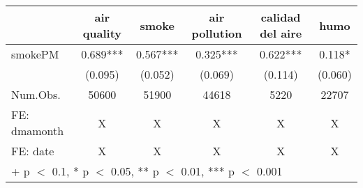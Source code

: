 \begin{table}
\centering
\begin{tabular}[t]{lccccc}
\toprule
  & air quality & smoke & air pollution & calidad del aire & humo\\
\midrule
smokePM & 0.689*** & 0.567*** & 0.325*** & 0.622*** & 0.118*\\
 & (0.095) & (0.052) & (0.069) & (0.114) & (0.060)\\
\midrule
Num.Obs. & 50600 & 51900 & 44618 & 5220 & 22707\\
FE: dmamonth & X & X & X & X & X\\
FE: date & X & X & X & X & X\\
\bottomrule
\multicolumn{6}{l}{\rule{0pt}{1em}+ p $<$ 0.1, * p $<$ 0.05, ** p $<$ 0.01, *** p $<$ 0.001}\\
\end{tabular}
\end{table}
